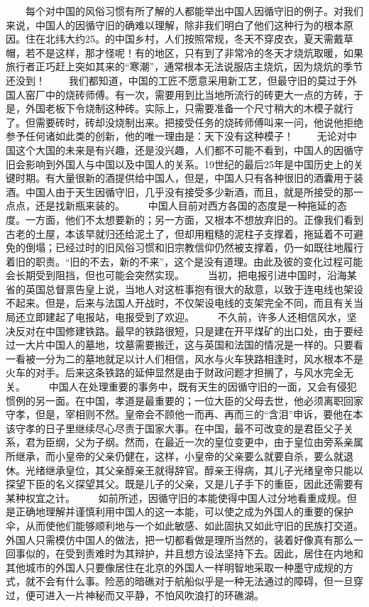 \documentclass[12pt,oneside]{book}
\begin{document}
\begin{common-format}
　　每个对中国的风俗习惯有所了解的人都能举出中国人因循守旧的例子。对我们来说，中国人的因循守旧的确难以理解，除非我们明白了他们这种行为的根本原因。住在北纬大约25。的中国乡村，人们按照常规，冬天不穿皮衣，夏天需戴草帽，若不是这样，那才怪呢！有的地区，只有到了非常冷的冬天才烧炕取暖，如果旅行者正巧赶上突如其来的“寒潮”，通常根本无法说服店主烧炕，因为烧炕的季节还没到！ 
　　我们都知道，中国的工匠不愿意采用新工艺，但最守旧的莫过于外国人窑厂中的烧砖师傅。有一次，需要用到比当地所流行的砖更大一点的方砖，于是，外国老板下令烧制这种砖。实际上，只需要准备一个尺寸稍大的木模子就行了。但需要砖时，砖却没烧制出来。把接受任务的烧砖师傅叫来一问，他说他拒绝参予任何诸如此类的创新，他的唯一理由是：天下没有这种模子！ 
　　无论对中国这个大国的未来是有兴趣，还是没兴趣，人们都不可能不看到，中国人的因循守旧会影响到外国人与中国以及中国人的关系。19世纪的最后25年是中国历史上的关键时期。有大量很新的酒提供给中国人，但是，中国人只有各种很旧的酒囊用于装酒。中国人由于天生因循守旧，几乎没有接受多少新酒，而且，就是所接受的那一点点，还是找新瓶来装的。 
　　中国人目前对西方各国的态度是一种拖延的态度。一方面，他们不太想要新的；另一方面，又根本不想放弃旧的。正像我们看到古老的土屋，本该早就归还给泥土了，但却用粗糙的泥柱子支撑着，拖延着不可避免的倒塌；已经过时的旧风俗习惯和旧宗教信仰仍然被支撑着，仍一如既往地履行着旧的职责。“旧的不去，新的不来”，这个是没有道理。由此及彼的变化过程可能会长期受到阻挡，但也可能会突然实现。 
　　当初，把电报引进中国时，沿海某省的英国总督禀告皇上说，当地人对这桩事抱有很大的敌意，以致于连电线也架设不起来。但是，后来与法国人开战时，不仅架设电线的支架完全不同，而且有关当局还立即建起了电报站，电报受到了欢迎。 
　　不久前，许多人还相信风水，坚决反对在中国修建铁路。最早的铁路很短，只是建在开平煤矿的出口处，由于要经过一大片中国人的墓地，坟墓需要搬迁，这与英国和法国的情况是一样的。只要看一看被一分为二的墓地就足以计人们相信，风水与火车狭路相逢时，风水根本不是火车的对手。后来这条铁路的延伸显然是由于财政问题才担搁了，与风水完全无关。 
　　中国人在处理重要的事务中，既有天生的因循守旧的一面，又会有侵犯惯例的另一面。在中国，孝道是最重要的；一位大臣的父母去世，他必须离职回家守孝，但是，宰相则不然。皇帝会不顾他一而再、再而三的“含泪”申诉，要他在本该守孝的日子里继续尽心尽责于国家大事。在中国，最不可改变的是君臣父子关系，君为臣纲，父为子纲。然而，在最近一次的皇位变更中，由于皇位由旁系亲属所继承，而小皇帝的父亲仍健在，这样，小皇帝的父亲要么就要自杀，要么就退休。光绪继承皇位，其父亲醇亲王就得辞官。醇亲王得病，其儿子光绪皇帝只能以探望下臣的名义探望其父。既是儿子的父亲，又是儿子手下的重臣，因此还需要有某种权宜之计。 
　　如前所述，因循守旧的本能使得中国人过分地看重成规。但是正确地理解并谨慎利用中国人的这一本能，可以使之成为外国人的重要的保护伞，从而使他们能够顺利地与一个如此敏感、如此固执又如此守旧的民族打交道。外国人只需模仿中国人的做法，把一切都看做是理所当然的，装着好像真有那么一回事似的，在受到责难时为其辩护，并且想方设法坚持下去。因此，居住在内地和其他城市的外国人只要像居住在北京的外国人一样明智地采取一种墨守成规的方式，就不会有什么事。险恶的暗礁对于航船似乎是一种无法通过的障碍，但一旦穿过，便可进入一片神秘而又平静，不怕风吹浪打的环礁湖。



\end{common-format}
\end{document}
